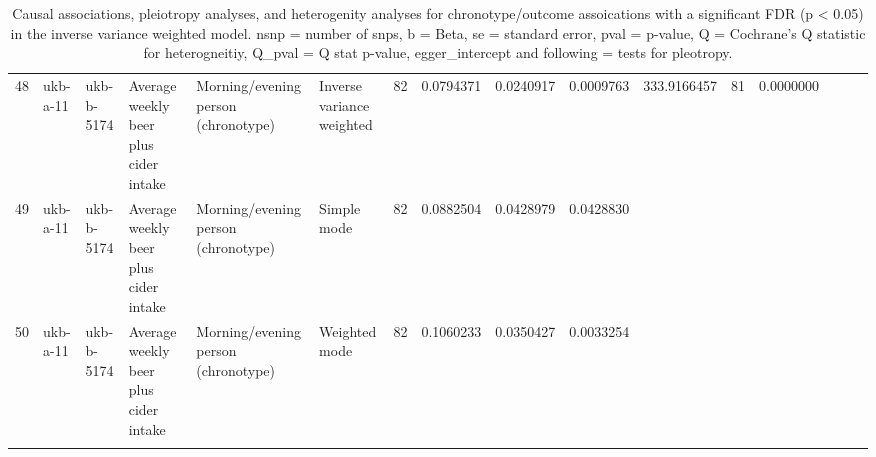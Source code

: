 \begin{longtable}{llllllrrrrrrrrrr}
  48 & ukb-a-11 & ukb-b-5174 & Average weekly beer plus cider intake & Morning/evening person (chronotype) & Inverse variance weighted & 82 & 0.0794371 & 0.0240917 & 0.0009763 & 333.9166457 & 81 & 0.0000000 &  &  &  \\ 
  49 & ukb-a-11 & ukb-b-5174 & Average weekly beer plus cider intake & Morning/evening person (chronotype) & Simple mode & 82 & 0.0882504 & 0.0428979 & 0.0428830 &  &  &  &  &  &  \\ 
  50 & ukb-a-11 & ukb-b-5174 & Average weekly beer plus cider intake & Morning/evening person (chronotype) & Weighted mode & 82 & 0.1060233 & 0.0350427 & 0.0033254 &  &  &  &  &  &  \\ 
   \hline
\hline
\caption{Causal associations, pleiotropy analyses, and heterogenity analyses for chronotype/outcome assoications with a significant FDR (p < 0.05) in the inverse variance weighted model. nsnp = number of snps, b = Beta,  se = standard error, pval = p-value, Q = Cochrane's Q statistic for heterogneitiy, Q_pval = Q stat p-value, egger_intercept and following = tests for pleotropy.} 
\label{FDR_Signif_CHR_Exposure}
\end{longtable}
